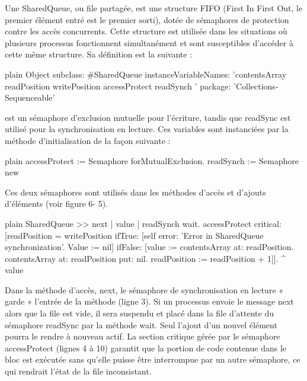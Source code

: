 \documentclass[10pt,twoside,english]{_support/latex/sbabook/sbabook}
\begin{document}
Une SharedQueue, ou file partag\'{e}e, est une structure FIFO (First In First Out, le premier \'{e}l\'{e}ment entr\'{e} est le premier sorti), dot\'{e}e de s\'{e}maphores de protection contre les acc\`{e}s concurrents. Cette structure est utilis\'{e}e dans les situations o\`{u} plusieurs processus fonctionnent simultan\'{e}ment et sont susceptibles d’acc\'{e}der \`{a} cette m\^{e}me structure.
Sa d\'{e}finition est la suivante :

\begin{displaycode}{plain}
Object subclass: #SharedQueue
	instanceVariableNames: 'contentsArray readPosition writePosition accessProtect readSynch ' 
	package: 'Collections-Sequenceable'
\end{displaycode}

 est un s\'{e}maphore d’exclusion mutuelle pour l’\'{e}criture, tandis que readSync est utilis\'{e} pour la synchronisation en lecture. Ces variables sont instanci\'{e}es par la m\'{e}thode d’initialisation de la fa\c{c}on suivante :

\begin{displaycode}{plain}
accessProtect := Semaphore forMutualExclusion.
readSynch := Semaphore new
\end{displaycode}

Ces deux s\'{e}maphores sont utilis\'{e}s dans les m\'{e}thodes d’acc\`{e}s et d’ajouts d’\'{e}l\'{e}ments (voir figure 6- 5).

\begin{displaycode}{plain}
SharedQueue >> next
	| value |
	readSynch wait.
	accessProtect
		critical: [readPosition = writePosition
				ifTrue: [self error: 'Error in SharedQueue synchronization'.
					Value := nil]
				ifFalse: [value := contentsArray at: readPosition.
					contentsArray at: readPosition put: nil.
					readPosition := readPosition + 1]].
	^ value
\end{displaycode}

Dans la m\'{e}thode d’acc\`{e}s, next, le s\'{e}maphore de synchronisation en lecture « garde » l’entr\'{e}e de la m\'{e}thode (ligne 3). Si un processus envoie le message next alors que la file est vide, il sera suspendu et plac\'{e} dans la file d’attente du s\'{e}maphore readSync par la m\'{e}thode wait. Seul l’ajout d’un nouvel \'{e}l\'{e}ment pourra le rendre \`{a} nouveau actif. La section critique g\'{e}r\'{e}e par le s\'{e}maphore accessProtect (lignes 4 \`{a} 10) garantit que la portion de code contenue dans le bloc est ex\'{e}cut\'{e}e sans qu’elle puisse \^{e}tre interrompue par un autre s\'{e}maphore, ce qui rendrait l’\'{e}tat de la file inconsistant.
\end{document}
